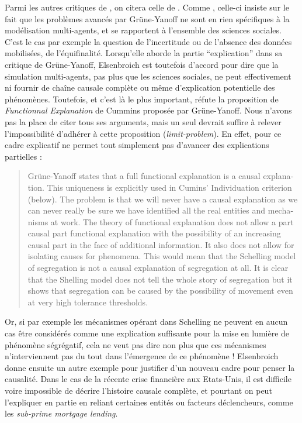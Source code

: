 Parmi les autres critiques de \textcite{Yanoff2008}, on citera celle de \textcite{Elsenbroich2012}. Comme \textcite{Chattoe2011}, celle-ci insiste sur le fait que les problèmes avancés par Grüne-Yanoff ne sont en rien spécifiques à la modélisation multi-agents, et se rapportent à l'ensemble des sciences sociales. C'est le cas par exemple la question de l'incertitude ou de l'absence des données mobilisées, de l'équifinalité. Lorsqu'elle aborde la partie \enquote{explication} dans sa critique de Grüne-Yanoff, Elsenbroich est toutefois d'accord pour dire que la simulation multi-agents, pas plus que les sciences sociales, ne peut effectivement ni fournir de chaîne causale complète ou même d'explication potentielle  des phénomènes. Toutefois, et c'est là le plus important, \textcite{Elsenbroich2012} réfute la proposition de \textit{Functionnal Explanation} de Cummins proposée par Grüne-Yanoff. Nous n'avons pas la place de citer tous ses arguments, mais un seul devrait suffire à relever l'impossibilité d'adhérer à cette proposition (\textit{limit-problem}). En effet, pour \textcite{Elsenbroich2012} ce cadre explicatif ne permet tout simplement pas d'avancer des explications partielles :

\foreignblockquote{english}[\cite{Elsenbroich2012}]{Grüne-Yanoff states that a full functional explanation is a causal explanation. This uniqueness is explicitly used in Cumins' Individuation criterion (below). The problem is that we will never have a causal explanation as we can never really be sure we have identified all the real entities and mechanisms at work. The theory of functional explanation does not allow a part causal part functional explanation with the possibility of an increasing causal part in the face of additional information. It also does not allow for isolating causes for phenomena. This would mean that the Schelling model of segregation is not a causal explanation of segregation at all. It is clear that the Shelling model does not tell the whole story of segregation but it shows that segregation can be caused by the possibility of movement even at very high tolerance thresholds.}

Or, si par exemple les mécanismes opérant dans Schelling ne peuvent en aucun cas être considérés comme une explication suffisante pour la mise en lumière de phénomène ségrégatif, cela ne veut pas dire non plus que ces mécanismes n'interviennent pas du tout dans l'émergence de ce phénomène ! Elsenbroich donne ensuite un autre exemple pour justifier d'un nouveau cadre pour penser la causalité. Dans le cas de la récente crise financière aux Etats-Unis, il est difficile voire impossible de décrire l'histoire causale complète, et pourtant on peut l'expliquer en partie en reliant certaines entités ou facteurs déclencheurs, comme les \textit{sub-prime mortgage lending}.

